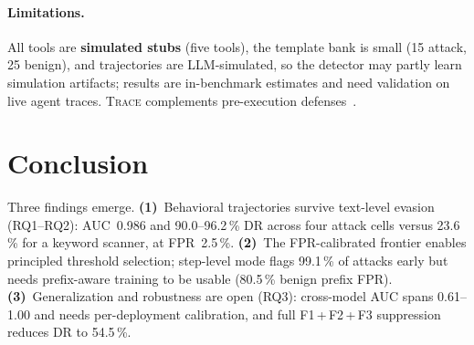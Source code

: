 \documentclass[conference]{IEEEtran}
\begin{document}
\paragraph{Limitations.}
All tools are \textbf{simulated stubs} (five tools), the template bank
is small (15 attack, 25 benign), and trajectories are LLM-simulated, so
the detector may partly learn simulation artifacts; results are
in-benchmark estimates and need validation on live agent traces.
\textsc{Trace} complements pre-execution
defenses~\cite{hines2024spotlighting,inan2023llama}.

\section{Conclusion}
\label{sec:conclusion}

Three findings emerge.
\textbf{(1)}~Behavioral trajectories survive text-level evasion
(RQ1--RQ2): AUC~0.986 and 90.0--96.2\,\% DR across four attack cells
versus 23.6\,\% for a keyword scanner, at FPR~2.5\,\%.
\textbf{(2)}~The FPR-calibrated frontier enables principled threshold
selection; step-level mode flags 99.1\,\% of attacks early but needs
prefix-aware training to be usable (80.5\,\% benign prefix FPR).
\textbf{(3)}~Generalization and robustness are open (RQ3): cross-model
AUC spans 0.61--1.00 and needs per-deployment calibration, and full
F1\,+\,F2\,+\,F3 suppression reduces DR to 54.5\,\%.




\end{document}
